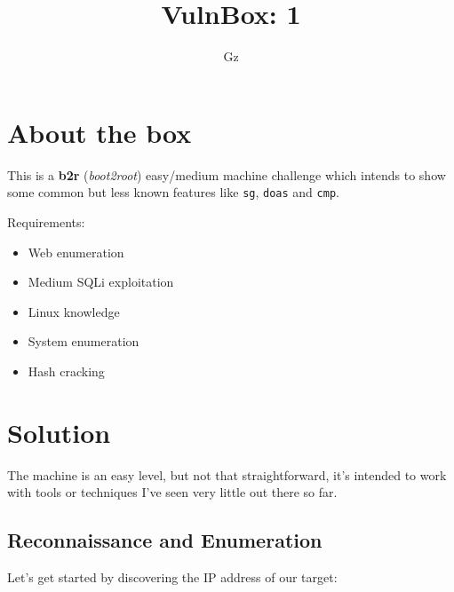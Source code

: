 \documentclass[12pt]{article}
\title{VulnBox: 1}
\author{Gz}
\date{}
\begin{document}
\maketitle
\tableofcontents
\pagebreak

\section{About the box}

    This is a \textbf{b2r} (\textit{boot2root}) easy/medium machine challenge
    which intends to show some common but less known features like \texttt{sg},
    \texttt{doas} and \texttt{cmp}.

    Requirements:
    \begin{itemize}
        \item Web enumeration
        \item Medium SQLi exploitation
        \item Linux knowledge
        \item System enumeration
        \item Hash cracking
    \end{itemize}

\section{Solution}

    The machine is an easy level, but not that straightforward, it's intended
    to work with tools or techniques I've seen very little out there so far.

\subsection{Reconnaissance and Enumeration}

    Let's get started by discovering the IP address of our target:
\end{document}
